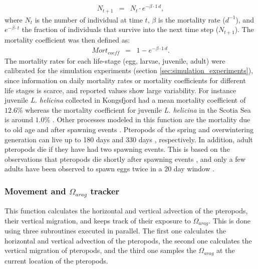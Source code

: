 {\scriptsize
\begin{eqnarray}
N_{t+1} & = & N_{t}\cdot e^{-\beta \cdot 1\, d},
\end{eqnarray}}
\noindent
where $N_{t}$ is the number of individual at time $t$, $\beta$ is the mortality rate ($d^{-1}$), and $e^{-\beta \cdot t}$ the fraction of individuals that survive into the next time step ($N_{t+1}$). The mortality coefficient was then defined as:
{\scriptsize
\begin{eqnarray}
Mort_{coeff} & = & 1 - e^{-\beta \cdot 1\, d}.
\end{eqnarray}}
\noindent
The mortality rates for each life-stage (egg, larvae, juvenile, adult) were calibrated for the simulation experiments (section \ref{sec:simulation_experiments}), since information on daily mortality rates \citep[$\beta$; ][]{Bednarsek2016CumulativeEffects}  or mortality coefficients \citep{Lischka2011WarmingAcidificationJuveniles} for different life stages is scarce, and reported values show large variability. For instance juvenile \textit{L. helicina} collected in Kongsfjord had a mean mortality coefficient of $12.6\%$ \citep{Lischka2011WarmingAcidificationJuveniles} whereas the mortality coefficient for juvenile \textit{L. helicina} in the Scotia Sea is around $1.0 \%$ \citep{Bednarsek2012Population,Bednarsek2016CumulativeEffects}. Other processes modeled in this function are the mortality due to old age \citep{Wang2017Lifecycle} and after spawning events \citep{Wang2017Lifecycle}. Pteropods of the spring and overwintering generation can live up to 180 days \citep{Howes2014Lab,Thabet2015Lifestages,Wang2017Lifecycle} and 330 days \citep{Wang2017Lifecycle}, respectively. In addition, adult pteropods die if they have had two spawning events. This is based on the observations that pteropods die shortly after spawning events \citep{Dadon1992Reproduction,Gannefors2005Overwintering,Hunt2008TopPredators,Howes2014Lab}, and only a few adults have been observed to spawn eggs twice in a 20 day window \citep{Paranjape1968egg}.





\subsubsection{Movement and $\Omega_{arag}$ tracker}
This function calculates the horizontal and vertical advection of the pteropods, their vertical migration, and keeps track of their exposure to $\Omega_{arag}$. This is done using three subroutines executed in parallel. The first one calculates the horizontal and vertical advection of the pteropods, the second one calculates the vertical migration of pteropods, and the third one samples the $\Omega_{arag}$ at the current location of the pteropods.

